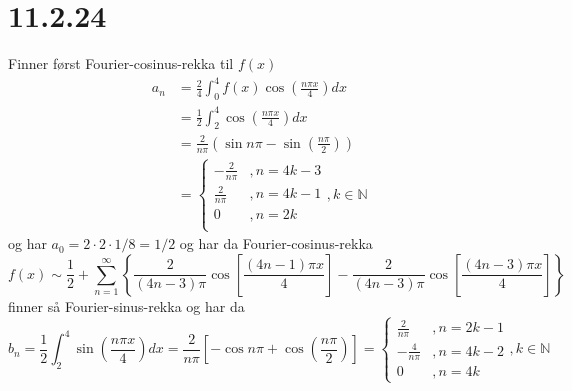 \documentclass{report}
\newcommand{\M}[2]{\mathbb{#1}^{#2}}
\newcommand{\nbrack}[1]{\left( #1 \right)}
\newcommand{\bbrack}[1]{\left[ #1 \right]}
\newcommand{\cbrack}[1]{\left\lbrace #1 \right\rbrace}
\begin{document}
\section*{11.2.24}
Finner først Fourier-cosinus-rekka til $f(x)$
\begin{equation}
  \label{eq:19}
  \begin{split}
    a_{n} &= \frac{2}{4} \int_{0}^{4} f(x) \cos \nbrack{ \frac{n\pi x}{4} }dx \\
    &= \frac{1}{2} \int_{2}^{4} \cos \nbrack{ \frac{n\pi x}{4} }dx \\
    &= \frac{2}{n\pi} \nbrack{ \sin n\pi - \sin \nbrack{ \frac{n\pi}{2} } } \\
    &= \left\lbrace
      \begin{array}{ll}
        -\frac{2}{n\pi} & , n = 4k - 3 \\
        \frac{2}{n\pi} & , n = 4k - 1 \\
        0 & , n = 2k \\
      \end{array} \right. , k\in \M{N}{}
  \end{split}
\end{equation}
og har $a_{0} = 2\cdot 2\cdot 1 / 8 = 1/2$
og har da Fourier-cosinus-rekka
\begin{equation}
  \label{eq:20}
  f(x) \sim \frac{1}{2} + \sum_{n=1}^{\infty} \cbrack{ \frac{2}{\nbrack{4n-3} \pi} \cos \bbrack{ \frac{\nbrack{4n-1} \pi x}{4} }
  -\frac{2}{\nbrack{4n-3}\pi} \cos \bbrack{ \frac{\nbrack{4n-3} \pi x}{4} } }
\end{equation}
finner så Fourier-sinus-rekka og har da
\begin{equation}
  \label{eq:21}
  b_{n} = \frac{1}{2} \int_{2}^{4} \sin \nbrack{\frac{n\pi x}{4}}dx = \frac{2}{n\pi} \bbrack{ -\cos n\pi + \cos \nbrack{ \frac{n\pi}{2} }}
  = \left\lbrace
    \begin{array}{ll}
      \frac{2}{n\pi} & , n = 2k-1 \\
      -\frac{4}{n\pi} & , n = 4k - 2 \\
      0 & , n = 4k
    \end{array} \right. , k \in \M{N}{}
\end{equation}
\end{document}
